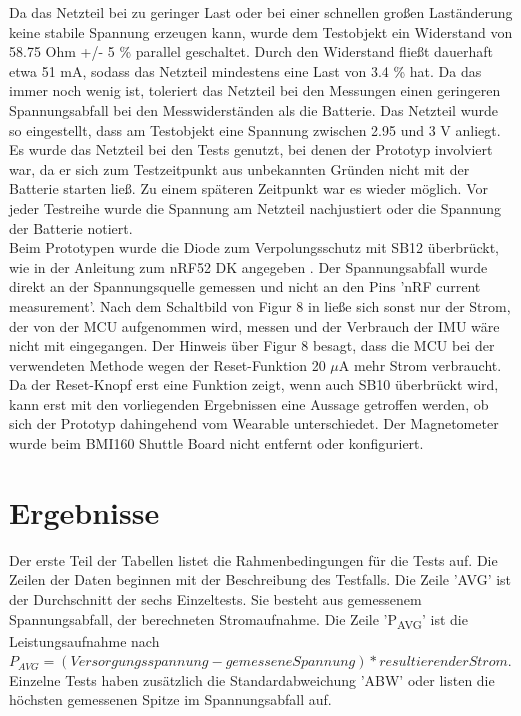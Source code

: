 Da das Netzteil bei zu geringer Last oder bei einer schnellen großen Laständerung keine stabile Spannung erzeugen kann, wurde dem Testobjekt ein Widerstand von 58.75 Ohm +/- 5 \% parallel geschaltet.
Durch den Widerstand fließt dauerhaft etwa 51 mA, sodass das Netzteil mindestens eine Last von 3.4 \% hat.
Da das immer noch wenig ist, toleriert das Netzteil bei den Messungen einen geringeren Spannungsabfall bei den Messwiderständen als die Batterie.
Das Netzteil wurde so eingestellt, dass am Testobjekt eine Spannung zwischen 2.95 und 3 V anliegt.
Es wurde das Netzteil bei den Tests genutzt, bei denen der Prototyp involviert war, da er sich zum Testzeitpunkt aus unbekannten Gründen nicht mit der Batterie starten ließ.
Zu einem späteren Zeitpunkt war es wieder möglich.
Vor jeder Testreihe wurde die Spannung am Netzteil nachjustiert oder die Spannung der Batterie notiert.\\
Beim Prototypen wurde die Diode zum Verpolungsschutz mit SB12 überbrückt, wie in der Anleitung zum nRF52 DK angegeben \cite{site_nrf52dk}.
Der Spannungsabfall wurde direkt an der Spannungsquelle gemessen und nicht an den Pins 'nRF current measurement'.
Nach dem Schaltbild von Figur 8 in \cite{site_nrf52dk} ließe sich sonst nur der Strom, der von der MCU aufgenommen wird, messen und der Verbrauch der IMU wäre nicht mit eingegangen.
Der Hinweis über Figur 8 besagt, dass die MCU bei der verwendeten Methode wegen der Reset-Funktion 20 $\mu$A mehr Strom verbraucht.
Da der Reset-Knopf erst eine Funktion zeigt, wenn auch SB10 überbrückt wird, kann erst mit den vorliegenden Ergebnissen eine Aussage getroffen werden, ob sich der Prototyp dahingehend vom Wearable unterschiedet.
Der Magnetometer wurde beim BMI160 Shuttle Board nicht entfernt oder konfiguriert.

\section{Ergebnisse}
Der erste Teil der Tabellen listet die Rahmenbedingungen für die Tests auf.
Die Zeilen der Daten beginnen mit der Beschreibung des Testfalls.
Die Zeile 'AVG' ist der Durchschnitt der sechs Einzeltests.
Sie besteht aus gemessenem Spannungsabfall, der berechneten Stromaufnahme.
Die Zeile 'P\textsubscript{AVG}' ist die Leistungsaufnahme nach $P_{AVG} = (Versorgungsspannung - gemesseneSpannung) * resultierender Strom$.
Einzelne Tests haben zusätzlich die Standardabweichung 'ABW' oder listen die höchsten gemessenen Spitze im Spannungsabfall auf.

